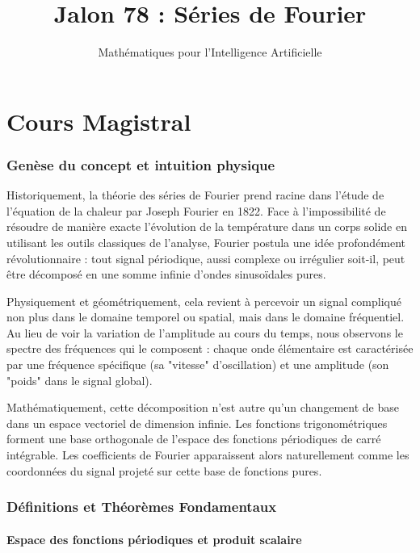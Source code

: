 \documentclass[12pt,a4paper]{article}
\title{Jalon 78 : Séries de Fourier}
\author{Mathématiques pour l'Intelligence Artificielle}
\date{}
\begin{document}
\maketitle
\tableofcontents
\newpage

\part{Cours Magistral}

\section{Genèse du concept et intuition physique}

Historiquement, la théorie des séries de Fourier prend racine dans l'étude de l'équation de la chaleur par Joseph Fourier en 1822. Face à l'impossibilité de résoudre de manière exacte l'évolution de la température dans un corps solide en utilisant les outils classiques de l'analyse, Fourier postula une idée profondément révolutionnaire : tout signal périodique, aussi complexe ou irrégulier soit-il, peut être décomposé en une somme infinie d'ondes sinusoïdales pures.

Physiquement et géométriquement, cela revient à percevoir un signal compliqué non plus dans le domaine temporel ou spatial, mais dans le domaine fréquentiel. Au lieu de voir la variation de l'amplitude au cours du temps, nous observons le spectre des fréquences qui le composent : chaque onde élémentaire est caractérisée par une fréquence spécifique (sa "vitesse" d'oscillation) et une amplitude (son "poids" dans le signal global).

Mathématiquement, cette décomposition n'est autre qu'un changement de base dans un espace vectoriel de dimension infinie. Les fonctions trigonométriques forment une base orthogonale de l'espace des fonctions périodiques de carré intégrable. Les coefficients de Fourier apparaissent alors naturellement comme les coordonnées du signal projeté sur cette base de fonctions pures.

\section{Définitions et Théorèmes Fondamentaux}

\subsection{Espace des fonctions périodiques et produit scalaire}
\end{document}
